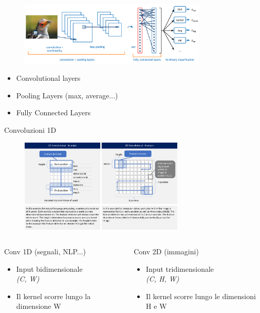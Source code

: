\documentclass[xcolor=x11names,compress, 
					handout %
]{beamer}
\theoremstyle{definition} \newtheorem{esempio}{Esempio}
\theoremstyle{definition}
\begin{document}
		\begin{frame}{\subsecname}
			\begin{figure}
				\includegraphics[width=0.8\textwidth]{immagini/cnnlayer}
			\end{figure}
			\begin{itemize}
				\item Convolutional layers
				\item Pooling Layers (max, average...)
				\item Fully Connected Layers
			\end{itemize}
		\end{frame}
		\begin{frame}{Convoluzioni 1D}
			\begin{figure}
				\includegraphics[width=0.7\textwidth]{immagini/conv1d}
			\end{figure}
			\begin{columns}
				\begin{column}{0.5\textwidth}
					Conv 1D (segnali, NLP...)
					\begin{itemize}
						\item Input bidimensionale\\\textit{(C, W)}
						\item Il kernel scorre lungo la dimensione W
					\end{itemize}
				\end{column}
				\begin{column}{0.5\textwidth}
					Conv 2D (immagini)
					\begin{itemize}
						\item Input tridimensionale\\\textit{(C, H, W)}
						\item Il kernel scorre lungo le dimensioni H e W
					\end{itemize}
				\end{column}
			\end{columns}
		\end{frame}
\end{document}
